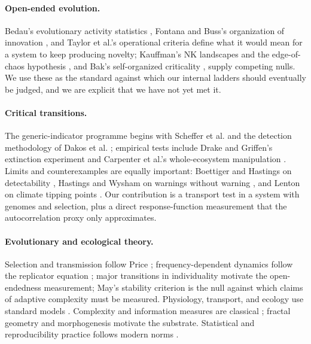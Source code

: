 \documentclass[11pt,a4paper]{article}
\begin{document}
\paragraph{Open-ended evolution.} Bedau's evolutionary activity statistics
\citep{bedau1998,bedau2003}, Fontana and Buss's organization of innovation
\citep{fontana1994}, and Taylor et al.'s operational criteria
\citep{taylor2016} define what it would mean for a system to keep producing
novelty; Kauffman's NK landscapes and the edge-of-chaos hypothesis
\citep{kauffman1993}, and Bak's self-organized criticality \citep{bak1987},
supply competing nulls. We use these as the standard against which our internal
ladders should eventually be judged, and we are explicit that we have not yet
met it.

\paragraph{Critical transitions.} The generic-indicator programme begins with
Scheffer et al. \citep{scheffer2009,scheffer2012} and the detection methodology of Dakos et
al. \citep{dakos2008,dakos2012}; empirical tests include Drake and Griffen's
extinction experiment \citep{drake2010} and Carpenter et al.'s whole-ecosystem
manipulation \citep{carpenter2011}. Limits and counterexamples are equally
important: Boettiger and Hastings on detectability \citep{boettiger2012},
Hastings and Wysham on warnings without warning \citep{hastings2010}, and Lenton
on climate tipping points \citep{lenton2011}. Our contribution is a transport
test in a system with genomes and selection, plus a direct response-function
measurement that the autocorrelation proxy only approximates.

\paragraph{Evolutionary and ecological theory.} Selection and transmission follow
Price \citep{price1970}; frequency-dependent dynamics follow the replicator
equation \citep{taylor1978}; major transitions in individuality
\citep{szathmary1995} motivate the open-endedness measurement; May's stability
criterion \citep{may1972} is the null against which claims of adaptive
complexity must be measured. Physiology, transport, and ecology use standard
models \citep{michaelis1913,berg1977,hodgkin1952,goldman1943,lindeman1942,holling1959}.
Complexity and information measures are classical
\citep{shannon1948,cover2006,lopezruiz1995,grassberger1983,lempelziv1976};
fractal geometry \citep{mandelbrot1982} and morphogenesis \citep{turing1952}
motivate the substrate. Statistical and reproducibility practice follows modern
norms \citep{student1908, welch1947,clopper1934,jeffreys1961,kass1995,nosek2018,steegen2016}.
\end{document}
